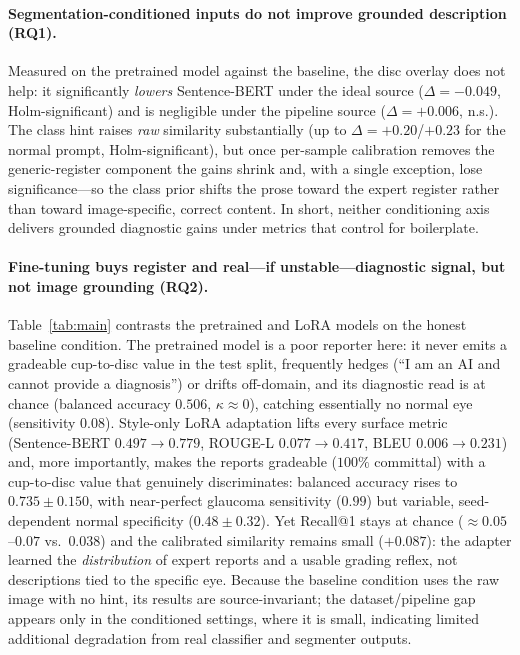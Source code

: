 \documentclass[runningheads]{llncs}
\begin{document}
\paragraph{Segmentation-conditioned inputs do not improve grounded description
(RQ1).} Measured on the pretrained model against the baseline, the disc overlay
does not help: it significantly \emph{lowers} Sentence-BERT under the ideal source
($\Delta=-0.049$, Holm-significant) and is negligible under the pipeline source
($\Delta=+0.006$, n.s.). The class hint raises \emph{raw} similarity
substantially (up to $\Delta=+0.20$/$+0.23$ for the normal prompt, Holm-significant),
but once per-sample calibration removes the generic-register component the gains
shrink and, with a single exception, lose significance---so the class prior shifts
the prose toward the expert register rather than toward image-specific, correct
content. In short, neither conditioning axis delivers grounded diagnostic gains
under metrics that control for boilerplate.

\paragraph{Fine-tuning buys register and real---if unstable---diagnostic signal,
but not image grounding (RQ2).} Table~\ref{tab:main} contrasts the pretrained and
\gls{LoRA} models on the honest baseline condition. The pretrained model is a poor
reporter here: it never emits a gradeable cup-to-disc value in the test split,
frequently hedges (``I am an AI and cannot provide a diagnosis'') or drifts
off-domain, and its diagnostic read is at chance (balanced accuracy $0.506$,
$\kappa\!\approx\!0$), catching essentially no normal eye (sensitivity $0.08$).
Style-only \gls{LoRA} adaptation lifts every surface metric (Sentence-BERT
$0.497\!\rightarrow\!0.779$, ROUGE-L $0.077\!\rightarrow\!0.417$, BLEU
$0.006\!\rightarrow\!0.231$) and, more importantly, makes the reports gradeable
($100\%$ committal) with a cup-to-disc value that genuinely discriminates:
balanced accuracy rises to $0.735\pm0.150$, with near-perfect glaucoma sensitivity
($0.99$) but variable, seed-dependent normal specificity ($0.48\pm0.32$). Yet
Recall@1 stays at chance ($\approx0.05$--$0.07$ vs.\ $0.038$) and the calibrated
similarity remains small ($+0.087$): the adapter learned the \emph{distribution}
of expert reports and a usable grading reflex, not descriptions tied to the
specific eye. Because the baseline condition uses the raw image with no hint, its
results are source-invariant; the dataset/pipeline gap appears only in the
conditioned settings, where it is small, indicating limited additional degradation
from real classifier and segmenter outputs.
\end{document}
